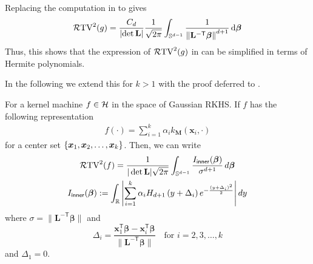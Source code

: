 Replacing the computation in  to  gives
\begin{align}
    \mathcal{R}\mathrm{TV}^2(g) = \frac{C_d}{\left|\det \mathbf{L}\right|} \frac{1}{\sqrt{2\pi}} \int_{\mathbb{S}^{d-1}} \frac{1}{{\left\|\mathbf{L}^{-\mathsf{T}}\bm{\beta}\right\|^{d+1}}} \,\mathrm{d}\bm{\beta} \label{eq: simprtv}
\end{align}
Thus, this shows that the expression of $\mathcal{R}\mathrm{TV}^2({g})$ in  can be simplified in terms of Hermite polynomials. 

In the following we extend this for $k > 1$ with the proof deferred to \iftoggle{longversion}{\appref{app: cov}}{the supplemental materials}.
\begin{lemma}\label{lem: cov}
 For a kernel machine $f \in {\mathcal{H}}$ in the space of Gaussian RKHS. If $f$ has the following representation%
    \begin{align*}
        f(\cdot) = \sum_{i =1}^k \alpha_i k_{\mathbf{M}}(\bm{x}_i,\cdot)
    \end{align*}
    for a center set $\left\{\bm{x}_1, \bm{x}_2,\ldots, \bm{x}_k\right\}$. Then, we can write%
    \begin{gather}
\mathcal{R}\mathrm{TV}^2({f}) = \frac{1}{|\det \mathbf{L}| \sqrt{2\pi}} \int_{\mathbb{S}^{d-1}} \frac{I_{\textsf{inner}}(\bm{\beta})}{\sigma^{d+1}} \, d\bm{\beta} \label{eq:transformed_I}\\
I_{\textsf{inner}}(\bm{\beta}) := \int_{\mathbb{R}} \left| \sum_{i=1}^k \alpha_i H_{d+1}\left( y + \Delta_i \right) e^{ -\frac{(y + \Delta_i)^2}{2} } \right| dy \label{eq:transformedinner}
\end{gather}
where $\sigma = \|\mathbf{L}^{-\mathsf{T}}\bm{\beta}\|$ and 
\[
\Delta_i = \frac{\bm{x}_1^\mathsf{T}\bm{\beta} - \bm{x}_i^\mathsf{T}\bm{\beta}}{\|\mathbf{L}^{-\mathsf{T}}\bm{\beta}\|}
\quad \text{for } i = 2, 3, \ldots, k
\]
and \( \Delta_1 = 0 \).
\end{lemma}


